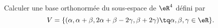 

\begin{exercice}\label{exoINGE1121La0001}

Calculer une base orthonormée du sous-espace de $\eR^4$ défini par
\begin{equation}
	V=\{ (\alpha,\alpha+\beta,2\alpha+\beta-2\gamma,\beta+2\gamma)\tq \alpha,\beta,\gamma\in\eR \}.
\end{equation}

\end{exercice}
